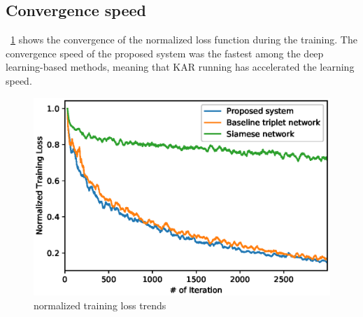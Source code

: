 \subsection{Convergence speed}
~\ref{fig_loss} shows the convergence of the normalized loss function during the training. The convergence speed of the proposed system was the fastest among the deep learning-based methods, meaning that KAR running has accelerated the learning speed.
 \begin{figure}[!ht]
    \includegraphics[width=\textwidth]{normalized_loss_curve_ma30_v3.eps}
    \caption{normalized training loss trends} \label{fig_loss}
\end{figure}
